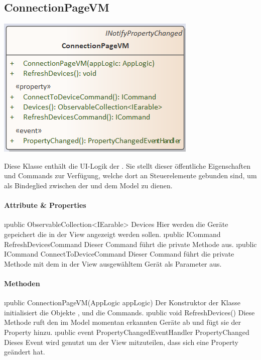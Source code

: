 \documentclass[../entwurf.tex]{subfiles}
\begin{document}
\subsection{ConnectionPageVM}
\begin{minipage}{0.55\textwidth}
\includegraphics[scale=0.75]{../graphics/vm_klassen/ConnectionPageVM.png}
\end{minipage}
\begin{minipage}{0.45\textwidth}
Diese Klasse enthält die UI-Logik der . Sie stellt dieser öffentliche Eigenschaften und Commands zur Verfügung, welche dort an Steuerelemente gebunden sind, um als Bindeglied zwischen der  und dem Model zu dienen.
\end{minipage}
\paragraph{Attribute \& Properties}
\begin{itemize}
	\i{public ObservableCollection<IEarable> Devices} Hier werden die Geräte gepeichert die in der View angezeigt werden sollen.
	\i{public ICommand RefreshDevicesCommand} Dieser Command führt die private Methode  aus.
	\i{public ICommand ConnectToDeviceCommand} Dieser Command führt die private Methode  mit dem in der View ausgewähltem Gerät als Parameter aus.
\end{itemize}
\paragraph{Methoden}
\begin{itemize}
	\i{public ConnectionPageVM(AppLogic appLogic)} Der Konstruktor der Klasse initialisiert die Objekte ,  und die Commands.
	\i{public void RefreshDevices()} Diese Methode ruft den im Model momentan erkannten Geräte ab und fügt sie der Property  hinzu.
	\i{public event PropertyChangedEventHandler PropertyChanged} Dieses Event wird genutzt um der View mitzuteilen, dass sich eine Property geändert hat.
\end{itemize}
\end{document}
